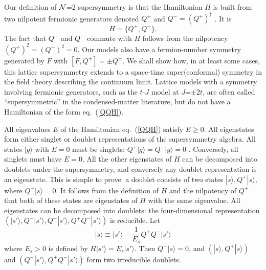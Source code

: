 \documentclass[a4paper,prl,aps,twocolumn]{revtex4}
\begin{document}
Our definition of ${\cal N}$=2 supersymmetry is that
the Hamiltonian $H$ is built from
two nilpotent fermionic generators denoted 
$Q^+$ and $Q^-=(Q^+)^\dagger$ \cite{Witten}. It is
\begin{equation}H=\{Q^+,Q^-\}.
\label{QQH}  
\end{equation}
The fact that $Q^+$ and $Q^-$ commute with $H$
follows from the nilpotency $(Q^+)^2=(Q^-)^2 =0$.
Our models also have a
fermion-number symmetry generated by $F$ with $[F,Q^\pm]=\pm
Q^\pm$.  We shall show how, in at least some cases, this lattice
supersymmetry extends to a space-time super(conformal) symmetry in the
field theory describing the continuum limit. Lattice
models with a symmetry involving fermionic generators, such as the
$t$-$J$ model at $J$=$\pm 2t$, are often called ``supersymmetric'' in
the condensed-matter literature, but do not have a Hamiltonian of the
form eq.~(\ref{QQH}).

All eigenvalues $E$ of the Hamiltonian eq.~(\ref{QQH}) satisfy
$E\ge 0$. All eigenstates form either singlet or doublet representations  
of the supersymmetry algebra.  All states $|g\rangle$ with $E=0$ must  
be singlets: $Q^+|g\rangle=Q^-|g\rangle=0$ \cite{Witten}.  Conversely,  
all singlets must have $E=0$.  All the other eigenstates of $H$ can be  
decomposed into doublets under the supersymmetry, and conversely any  
doublet representation is an eigenstate. This is simple to prove: a  
doublet consists of two states $|s\rangle,Q^+|s\rangle$, where  
$Q^-|s\rangle =0$. It follows from the definition of $H$ and the  
nilpotency of $Q^\pm$ that both of these states are eigenstates of $H$  
with the same eigenvalue. All eigenstates can be decomposed into  
doublets:  the four-dimensional  
representation $(|s'\rangle,Q^-|s'\rangle,Q^+|s'\rangle, Q^+Q^-|s'\rangle)$
is reducible. Let
$$|s\rangle\equiv |s'\rangle -\frac{1}{E_s} Q^+Q^-|s'\rangle$$
where $E_s>0$ is defined by $H|s'\rangle = E_s|s'\rangle$. Then
$Q^-|s\rangle =0$, and $(|s\rangle,Q^+|s\rangle)$ and
$(Q^-|s'\rangle,Q^+Q^-|s'\rangle)$ form two irreducible doublets.
  
\end{document}
